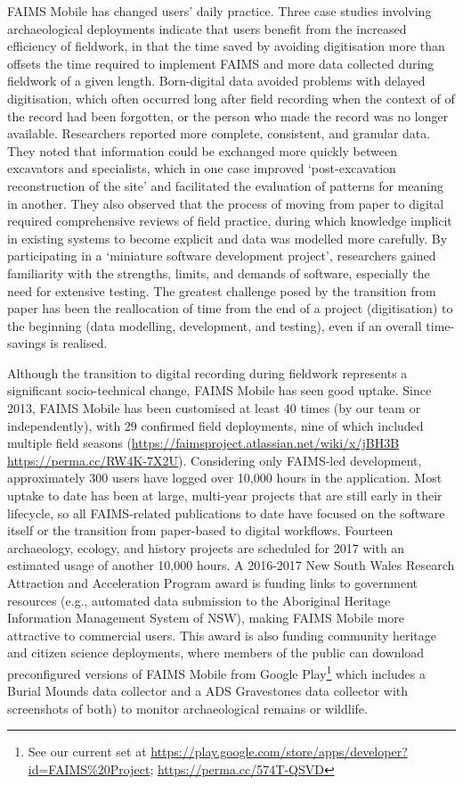 \documentclass[preprint,12pt, a4paper]{elsarticle}
\begin{document}
FAIMS Mobile has changed users' daily practice. Three case studies involving archaeological deployments \cite{Sobotkova2016-mx} indicate that users benefit from the increased efficiency of fieldwork, in that the time saved by avoiding digitisation more than offsets the time required to implement FAIMS and more data collected during fieldwork of a given length. Born-digital data avoided problems with delayed digitisation, which often occurred long after field recording when the context of of the record had been forgotten, or the person who made the record was no longer available. Researchers reported more complete, consistent, and granular data. They noted that information could be exchanged more quickly between excavators and specialists, which in one case improved `post-excavation reconstruction of the site' and facilitated the evaluation of patterns for meaning in another. They also observed that the process of moving from paper to digital required comprehensive reviews of field practice, during which knowledge implicit in existing systems to become explicit and data was modelled more carefully. By participating in a `miniature software development project', researchers gained familiarity with the strengths, limits, and demands of software, especially the need for extensive testing. The greatest challenge posed by the transition from paper has been the reallocation of time from the end of a project (digitisation) to the beginning (data modelling, development, and testing), even if an overall time-savings is realised. 

Although the transition to digital recording during fieldwork represents a significant socio-technical change, FAIMS Mobile has seen good uptake. Since 2013, FAIMS Mobile has been customised at least 40 times (by our team or independently), with 29 confirmed field deployments, nine of which included multiple field seasons (\url{https://faimsproject.atlassian.net/wiki/x/jBH3B} \url{https://perma.cc/RW4K-7X2U}). Considering only FAIMS-led development, approximately 300 users have logged over 10,000 hours in the application. Most uptake to date has been at large, multi-year projects that are still early in their lifecycle, so all FAIMS-related publications to date have focused on the software itself or the transition from paper-based to digital workflows. Fourteen archaeology, ecology, and history projects are scheduled for 2017 with an estimated usage of another 10,000 hours. A 2016-2017 New South Wales Research Attraction and Acceleration Program award is funding links to government resources (e.g., automated data submission to the Aboriginal Heritage Information Management System of NSW), making FAIMS Mobile more attractive to commercial users. This award is also funding community heritage and citizen science deployments, where members of the public can download preconfigured versions of FAIMS Mobile from Google Play\footnote{See our current set at \url{https://play.google.com/store/apps/developer?id=FAIMS\%20Project}; \url{https://perma.cc/574T-QSVD} } which includes a Burial Mounds data collector and a ADS Gravestones data collector with screenshots of both) to monitor archaeological remains or wildlife.
\end{document}
